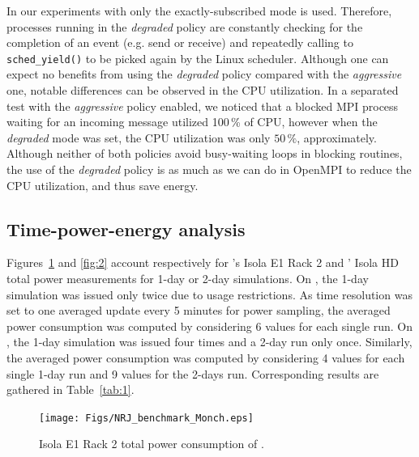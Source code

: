 In our experiments with \cosmoart only the exactly-subscribed mode  is
used. Therefore, \cosmoart processes running  in  the  \emph{degraded} 
policy are constantly checking for the completion  of  an  event (e.g. 
send or receive) and repeatedly calling to  \texttt{sched\_yield()} to 
be picked again by the Linux scheduler. Although one can expect no benefits 
from   using   the  \emph{degraded}   policy   compared   with     the 
\emph{aggressive} one, notable differences can be observed in the CPU utilization. 
In a separated  test  with  the  \emph{aggressive}  policy 
enabled, we noticed that a blocked MPI process waiting for an incoming 
message utilized 100\,\% of CPU,  however  when  the \emph{degraded} 
mode  was  set,  the  CPU  utilization was only $50\,\%$, approximately. 
Although neither of both policies avoid busy-waiting loops in blocking 
routines, the use of the \emph{degraded} policy is as much as we can 
do in OpenMPI to reduce the CPU utilization, and thus save energy.


\subsection{Time-power-energy analysis}
\label{subsec:4.2}

Figures~\ref{fig:1} and \ref{fig:2}  account respectively for \monch's
Isola  E1 Rack 2  and \pilat'  Isola HD  total power  measurements for
1-day or 2-day simulations. On \monch, the 1-day simulation was issued
only twice due  to usage restrictions.  As time  resolution was set to
one averaged update every  5 minutes  for power  sampling, the  averaged power
consumption was computed by considering  6 values for each single run.
On \pilat, the 1-day simulation was  issued four times and a 2-day run
only once.  Similarly, the  averaged power consumption was computed by
considering 4  values for each single  1-day run and 9  values for the
2-days run. Corresponding results are gathered in Table~\ref{tab:1}.

\begin{figure}[ht]
  \centering
  \texttt{[image: Figs/NRJ\_benchmark\_Monch.eps]}
  \caption{Isola E1 Rack 2 total power consumption of \monch.}
  \label{fig:1}
\end{figure}

